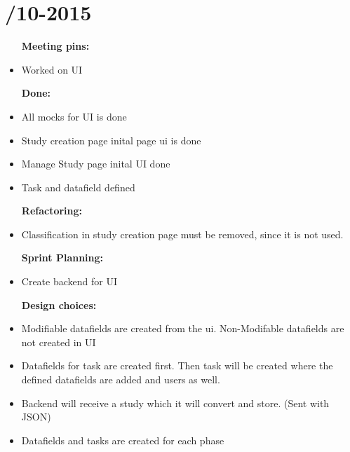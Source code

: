 \section{/10-2015} %
\attend{\at}{\nat}{\nat}{\at}


\begin{itemize}
	\item [\textbf{Meeting pins:}]
	\item Worked on UI
	\
	\end{itemize}

\begin{itemize}
	\item [\textbf{Done:}]
	\item All mocks for UI is done
	\item Study creation page inital page ui is done
	\item Manage Study page inital UI done
	\item Task and datafield defined
\end{itemize}

\begin{itemize}
	\item [\textbf{Refactoring:}]
	\item Classification in study creation page must be removed, since it is not used.
\end{itemize}

\begin{itemize}
	\item [\textbf{Sprint Planning:}]
	\item Create backend for UI
\end{itemize}

\begin{itemize}
	\item [\textbf{Design choices:}]
	\item Modifiable datafields are created from the ui. Non-Modifable datafields are not created in UI
	\item Datafields for task are created first. Then task will be created where the defined datafields are added and users as well.
	\item Backend will receive a study which it will convert and store. (Sent with JSON)
	\item Datafields and tasks are created for each phase
	 
\end{itemize}